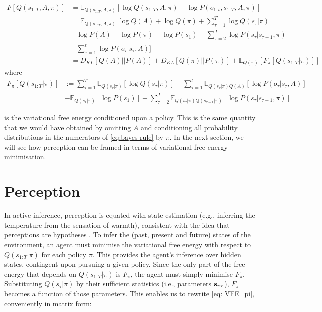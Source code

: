 \documentclass[review,12pt,authoryear]{elsarticle}
\newcommand{\E}{\mathbb E}
\begin{document}
  	\begin{equation}
  	\label{eq: computing VFE}
  	    \begin{split}
  	        F[Q(s_{1:T},A, \pi)]&= \E_{Q(s_{1:T},A, \pi)}[\log Q(s_{1:T},A, \pi) - \log P(o_{1:t},s_{1:T},A, \pi)] \\
  	        &= \E_{Q(s_{1:T},A, \pi)}[\log Q(A) +  \log Q(\pi)+\sum_{\tau = 1}^T  \log Q(s_\tau|\pi) \\
  	        &-\log P(A) -\log P(\pi)- \log P(s_1)- \sum_{\tau =2}^T\log P(s_\tau |s_{\tau-1},\pi)\\
  	        &-\sum_{\tau = 1}^t \log P(o_{\tau}|s_{\tau},A)] \\
  	        &=D_{KL}[Q(A)||P(A)]+D_{KL}[Q(\pi)||P(\pi)]+\E_{Q(\pi)}[F_\pi[Q(s_{1:T}|\pi)]]
  	    \end{split}
  	\end{equation}
where
\begin{equation}
  	\label{eq: VFE_pi}
  	    \begin{split}
  	        F_\pi[Q(s_{1:T}|\pi)] & := \sum_{\tau =1}^T\E_{Q(s_\tau |\pi)}[\log Q(s_\tau |\pi)] -\sum_{\tau = 1}^t \E_{Q(s_\tau |\pi)Q(A)}[\log P(o_{\tau}|s_{\tau},A)] \\
  	        &-\E_{Q(s_1 |\pi)}[\log P(s_1)]-\sum_{\tau =2}^T \E_{Q(s_\tau |\pi)Q(s_{\tau-1} |\pi)}[\log P(s_\tau |s_{\tau-1},\pi)]
      	    \end{split}
  	\end{equation}
  	
is the variational free energy conditioned upon a policy. This is the same quantity that we would have obtained by omitting $A$ and conditioning all probability distributions in the numerators of \eqref{eq:bayes rule} by $\pi$. In the next section, we will see how perception can be framed in terms of variational free energy minimisation.

\section{Perception}

In active inference, perception is equated with state estimation \citep{fristonActiveInferenceProcess2017} (e.g., inferring the temperature from the sensation of warmth), consistent with the idea that perceptions are hypotheses \citep{gregoryPerceptionsHypotheses1980}. To infer the (past, present and future) states of the environment, an agent must minimise the variational free energy with respect to $Q(s_{1:T}|\pi)$ for each policy $\pi$. This provides the agent’s inference over hidden states, contingent upon pursuing a given policy. Since the only part of the free energy that depends on $Q(s_{1:T}|\pi)$ is $F_\pi$, the agent must simply minimise $F_\pi$. 
Substituting $Q(s_{\tau}|\pi)$ by their sufficient statistics (i.e., parameters $\bold s_{\pi \tau}$), $F_\pi$ becomes a function of those parameters. This enables us to rewrite \eqref{eq: VFE_pi}, conveniently in matrix form:
\end{document}
